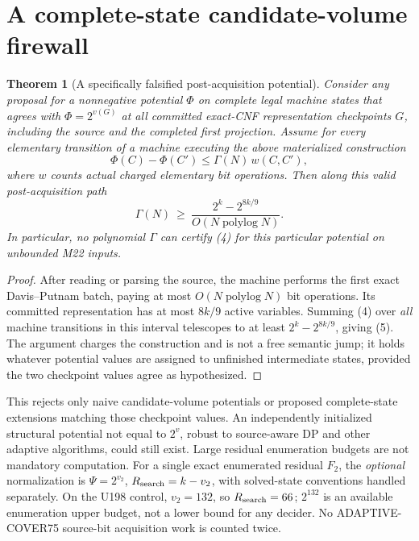 \documentclass[11pt]{article}
\newtheorem{theorem}{Theorem}
\begin{document}
\section{A complete-state candidate-volume firewall}
\begin{theorem}[A specifically falsified post-acquisition potential]
Consider any proposal for a nonnegative potential \(\Phi\) on
\emph{complete legal machine states} that agrees with
\(\Phi=2^{v(G)}\) at all committed exact-CNF representation
checkpoints \(G\), including the source and the completed first
projection. Assume for every elementary transition of a
machine executing the above materialized construction
\[
\Phi(C)-\Phi(C')\le \Gamma(N)\,w(C,C'), \tag{4}
\]
where \(w\) counts actual charged elementary bit operations.
Then along this valid \emph{post-acquisition} path
\[
\boxed{\quad
\Gamma(N)\ \ge\
\frac{2^k-2^{8k/9}}
{O(N\operatorname{polylog}N)}.\quad}\tag{5}
\]
In particular, no polynomial \(\Gamma\) can certify (4) for
this \emph{particular} potential on unbounded M22 inputs.
\end{theorem}
\begin{proof}
After reading or parsing the source, the machine performs the
first exact Davis--Putnam batch, paying at most
\(O(N\operatorname{polylog}N)\) bit operations. Its committed
representation has at most \(8k/9\) active variables. Summing
(4) over \emph{all} machine transitions in this interval
telescopes to at least \(2^k-2^{8k/9}\), giving (5).
The argument charges the construction and is not a free
semantic jump; it holds whatever potential values are assigned
to unfinished intermediate states, provided the two checkpoint
values agree as hypothesized.
\end{proof}
\noindent This rejects only naive candidate-volume potentials
or proposed complete-state extensions matching those checkpoint
values. An independently initialized structural potential not
equal to \(2^v\), robust to source-aware DP and other adaptive
algorithms, could still exist. Large residual enumeration budgets
are not mandatory computation. For a single exact enumerated
residual \(F_2\), the \emph{optional} normalization is
\(\Psi=2^{v_2}\), \(R_{\rm search}=k-v_2\), with solved-state
conventions handled separately. On the U198 control,
\(v_2=132\), so \(R_{\rm search}=66\); \(2^{132}\) is an available
enumeration upper budget, not a lower bound for any decider.
No ADAPTIVE-COVER75 source-bit acquisition work is counted twice.
\end{document}
